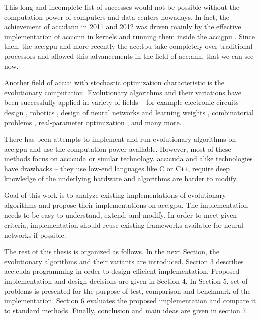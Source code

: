 This long and incomplete list of successes would not be possible without the computation power of computers and data centers nowadays. In fact, the achievement of \acrshort{acc:dann} in 2011 and 2012 was driven mainly by the effective implementation of \acrfull{acc:cnn} in kernels and running them inside the \acrfull{acc:gpu} \cite{CIRESAN2012333}. Since then, the \acrshort{acc:gpu} and more recently the \acrfull{acc:tpu} take completely over traditional processors and allowed this advancements in the field of \acrshort{acc:ann}, that we can see now.

Another field of \acrlong{acc:ai} with stochastic optimization characteristic is the evolutionary computation. Evolutionary algorithms and their variations have been successfully applied in variety of fields -- for example 
electronic circuits design \cite{NASAantenaDesign}\allowbreak\cite{circuitdesignoptimizationea},
robotics \cite{EvolutionaryRobotics}\allowbreak\cite{RoboticsInPhysX}\allowbreak\cite{nygaard2018realworld},
design of neural networks and learning weights \cite{NEAT}\allowbreak\cite{Floreano2008NeuroevolutionFA},
combinatorial problems \cite{GeneticAssambleLineBalancingProblem}\allowbreak\cite{ALBAYRAK20111313}, 
real-parameter optimization \cite{IntroNaturalEvolutionStrategies}, and many more.

There has been attempts to implement and run evolutionary algorithms on \acrshort{acc:gpu} \cite{cheng2019accelerating}\allowbreak\cite{CHENG2019514} and use the computation power available. However, most of these methods focus on \acrfull{acc:cuda} or similar technology. \acrshort{acc:cuda} and alike technologies have drawbacks -- they use low-end languages like C or C\texttt{++}, require deep knowledge of the underlying hardware and algorithms are harder to modify.

Goal of this work is to analyze existing implementations of evolutionary algorithms and propose their implementations on \acrshort{acc:gpu}. The implementation needs to be easy to understand, extend, and modify. In order to meet given criteria, implementation should reuse existing frameworks available for neural networks if possible.

The rest of this thesis is organized as follows. 
In the next Section, the evolutionary algorithms and their variants are introduced. 
Section 3 describes \acrshort{acc:cuda} programming in order to  design efficient implementation.
Proposed implementation and design decisions are given in Section 4. 
In Section 5, set of problems is presented for the purpose of test, comparison and benchmark of the implementation.
Section 6 evaluates the proposed implementation and compare it to standard methods.
Finally, conclusion and main ideas are given in section 7.
